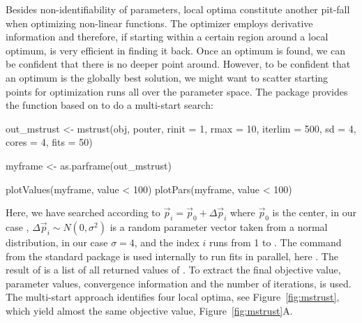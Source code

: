 \documentclass[article]{jss}
\begin{document}
Besides non-identifiability of parameters, local optima constitute another pit-fall when optimizing non-linear functions. The  optimizer employs derivative information and therefore, if starting within a certain region around a local optimum, is very efficient in finding it back. Once an optimum is found, we can be confident that there is no deeper point around. However, to be confident that an optimum is the globally best solution, we might want to scatter starting points for optimization runs all over the parameter space. The  package provides the  function based on  to do a multi-start search:
\begin{CodeChunk}
\begin{CodeInput}
out_mstrust <- mstrust(obj, pouter, rinit = 1, rmax = 10, iterlim = 500,
                       sd = 4,
                       cores = 4, fits = 50)

myframe <- as.parframe(out_mstrust)

plotValues(myframe, value < 100)
plotPars(myframe, value < 100)
\end{CodeInput}
\end{CodeChunk}
Here, we have searched according to $\vec p_i = \vec p_0 + \Delta\vec p_i$ where $\vec p_0$ is the center, in our case , $\Delta\vec p_i\sim N(0, \sigma^2)$ is a random parameter vector taken from a normal distribution, in our case $\sigma = 4$, and the index $i$ runs from 1 to . The  command from the standard  package \citep{parallel} is used internally to run fits in parallel, here . The result of  is a list of all returned values of . To extract the final objective value, parameter values, convergence information and the number of iterations,  is used. The multi-start approach identifies four local optima, see Figure~\ref{fig:mstrust}, which yield almost the same objective value, Figure~\ref{fig:mstrust}A.
\end{document}
